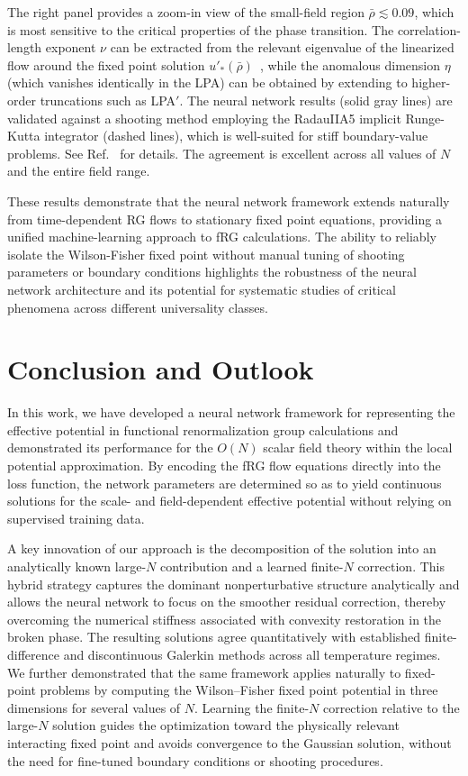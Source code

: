 \documentclass[reprint,twocolumn,superscriptaddress,preprintnumbers,amsmath,amssymb,aps,prd,floatfix]{revtex4-2}
\begin{document}
The right panel provides a zoom-in view of the small-field region $\bar{\rho}\lesssim 0.09$, which is most sensitive to the critical properties of the phase transition. The correlation-length exponent $\nu$ can be extracted from the relevant eigenvalue of the linearized flow around the fixed point solution $u'_*(\bar{\rho})$~\cite{Tan:2022ksv}, while the anomalous dimension $\eta$ (which vanishes identically in the LPA) can be obtained by extending to higher-order truncations such as LPA$'$. The neural network results (solid gray lines) are validated against a shooting method employing the RadauIIA5 implicit Runge-Kutta integrator (dashed lines), which is well-suited for stiff boundary-value problems. See Ref.~\cite{Tan:2022ksv} for details. The agreement is excellent across all values of $N$ and the entire field range.

These results demonstrate that the neural network framework extends naturally from time-dependent RG flows to stationary fixed point equations, providing a unified machine-learning approach to fRG calculations. The ability to reliably isolate the Wilson-Fisher fixed point without manual tuning of shooting parameters or boundary conditions highlights the robustness of the neural network architecture and its potential for systematic studies of critical phenomena across different universality classes.

\section{Conclusion and Outlook}
\label{sec:conclusion}

In this work, we have developed a neural network framework for representing the effective potential in functional renormalization group calculations and demonstrated its performance for the $O(N)$ scalar field theory within the local potential approximation. By encoding the fRG flow equations directly into the loss function, the network parameters are determined so as to yield continuous solutions for the scale- and field-dependent effective potential without relying on supervised training data.

A key innovation of our approach is the decomposition of the solution into an analytically known large-$N$ contribution and a learned finite-$N$ correction. This hybrid strategy captures the dominant nonperturbative structure analytically and allows the neural network to focus on the smoother residual correction, thereby overcoming the numerical stiffness associated with convexity restoration in the broken phase. The resulting solutions agree quantitatively with established finite-difference and discontinuous Galerkin methods across all temperature regimes. We further demonstrated that the same framework applies naturally to fixed-point problems by computing the Wilson–Fisher fixed point potential in three dimensions for several values of $N$. Learning the finite-$N$ correction relative to the large-$N$ solution guides the optimization toward the physically relevant interacting fixed point and avoids convergence to the Gaussian solution, without the need for fine-tuned boundary conditions or shooting procedures.
\end{document}
